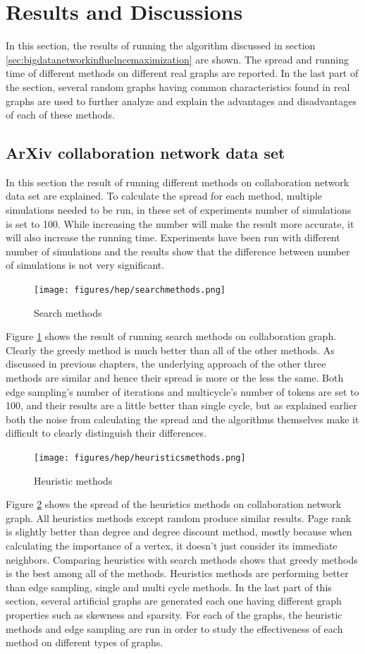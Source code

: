 \documentclass[english]{tktltiki}
\begin{document}
\section{Results and Discussions}
\label{sec:resanddis}
In this section, the results of running the algorithm discussed in section \ref{sec:bigdatanetworkinfluelncemaximization} are shown. The spread and running time of different methods on different real graphs are reported. In the last part of the section, several random graphs having common characteristics found in real graphs are used to further analyze and explain the advantages and disadvantages of each of these methods.

\subsection{ArXiv collaboration network data set} 
In this section the result of running different methods on collaboration network data set are explained. To calculate the spread for each method, multiple simulations needed to be run, in these set of experiments number of simulations is set to 100. While increasing the number will make the result more accurate, it will also increase the running time. Experiments have been run with different number of simulations and the results show that the difference between number of simulations is not very significant. 
\begin{figure}[ht!]
\centering
\texttt{[image: figures/hep/searchmethods.png]}
\caption{Search methods}
\label{hep:searchmethods}
\end{figure}
Figure \ref{hep:searchmethods} shows the result of running search methods on collaboration graph. Clearly the greedy method is much better than all of the other methods. As discussed in previous chapters, the underlying approach of the other three methods are similar and hence their spread is more or the less the same. Both edge sampling's number of iterations and multicycle's number of tokens are set to 100, and their results are a little better than single cycle, but as explained earlier both the noise from calculating the spread and the algorithms themselves make it difficult to clearly distinguish their differences.
\begin{figure}[ht!]
\centering
\texttt{[image: figures/hep/heuristicsmethods.png]}
\caption{Heuristic methods}
\label{hep:heuristicmethods}
\end{figure}
Figure \ref{hep:heuristicmethods} shows the spread of the heuristics methods on collaboration network graph.  All heuristics methods except random produce similar results. Page rank is slightly better than degree and degree discount method, mostly because when calculating the importance of a vertex, it doesn't just consider its immediate neighbors. Comparing heuristics with search methods shows that greedy methods is the best among all of the methods. Heuristics methods are performing better than edge sampling, single and multi cycle methods. In the last part of this section, several artificial graphs are generated each one having different graph properties such as skewness and sparsity. For each of the graphs, the heuristic methods and edge sampling are run in order to study the effectiveness of each method on different types of graphs.
\end{document}
